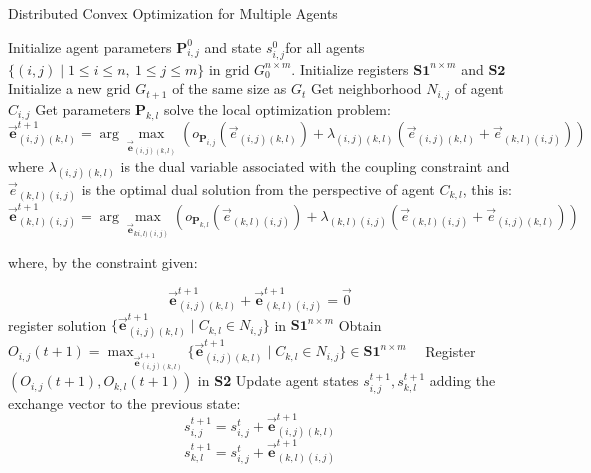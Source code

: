 \documentclass[12pt]{article}
\begin{document}
\begin{algorithm}
\caption{Distributed Convex Optimization for Multiple Agents}
\begin{algorithmic}[1]
\State Initialize agent parameters \( \mathbf{P}_{i,j}^0 \) and state \( s_{i,j}^0\)for all agents $\{(i, j) \mid 1 \leq i \leq n, \ 1 \leq j \leq m\}$ in grid $G_{0}^{n \times m}$.
\State Initialize registers \( \textbf{S1}^{n \times m} \) and \( \textbf{S2} \)
    \State Initialize a new grid \( G_{t+1} \) of the same size as \( G_{t} \)
        \State Get neighborhood \( N_{i, j} \) of agent \( C_{i, j} \)
            \State Get parameters \( \mathbf{P}_{k,l} \)
            \State  solve the local optimization problem:
            \[
            \mathbf{\vec{e}}_{(i,j)(k,l)}^{t+1} = \arg \max_{\mathbf{\vec{e}}_{(i,j)(k,l)}} \left( o_{\mathbf{P}_{i,j} }(\vec{e}_{(i,j)(k,l)}) + \lambda_{(i,j)(k,l)} \left( \vec{e}_{(i,j)(k,l)} + \vec{e}_{(k,l)(i,j)} \right) \right)
            \]
            where \( \lambda_{(i,j)(k,l)} \) is the dual variable associated with the coupling constraint and \( \vec{e}_{(k,l)(i,j)} \) is the optimal dual solution from the perspective of agent \( C_{k,l} \), this is:
            \[
            \mathbf{\vec{e}}_{(k,l)(i,j)}^{t+1} = \arg \max_{\mathbf{\vec{e}}_{ki,l)(i,j)}} \left( o_{\mathbf{P}_{k,l} }(\vec{e}_{(k,l)(i,j)}) + \lambda_{(k,l)(i,j)} \left( \vec{e}_{(k,l)(i,j)} + \vec{e}_{(i,j)(k,l)} \right) \right)
            \]
            
            where, by the constraint given:
            
            \[
            \mathbf{\vec{e}}_{(i,j)(k,l)}^{t+1} + \mathbf{\vec{e}}_{(k,l)(i,j)}^{t+1} = \vec{0}
            \]
            \State register solution \(\{ \mathbf{\vec{e}}_{(i,j)(k,l)}^{t+1} \mid C_{k,l} \in N_{i,j}  \}\) in \( \textbf{S1}^{n \times m} \)
        \EndFor
        \State Obtain \( O_{i,j}(t+1) = \max_{\mathbf{\vec{e}}_{(i,j)(k,l)}^{t+1}} \{ \mathbf{\vec{e}}_{(i,j)(k,l)}^{t+1} \mid C_{k,l} \in N_{i,j}  \} \in \textbf{S1}^{n \times m} \quad \)
            \State Register \( (O_{i,j}(t+1), O_{k,l}(t+1) )\) in \textbf{S2}
        \EndIf
    \EndFor
        \State Update agent states \( s_{i,j}^{t+1}, s_{k,l}^{t+1} \) adding the exchange vector to the previous state:
    \[
    s_{i,j}^{t+1} = s_{i,j}^{t} + \mathbf{\vec{e}}_{(i,j)(k,l)}^{t+1} 
    \]
    \[
    s_{k,l}^{t+1} = s_{i,j}^{t} + \mathbf{\vec{e}}_{(k,l)(i,j)}^{t+1} 
    \]
    \EndFor
\EndFor
\end{algorithmic}
\end{algorithm}
\end{document}
